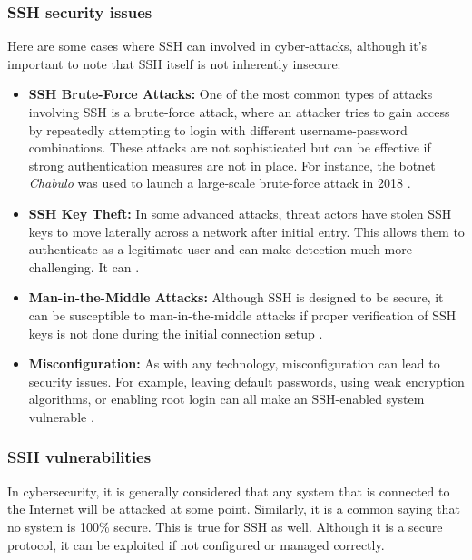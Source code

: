     \subsubsection{SSH security issues}
    Here are some cases where SSH can involved in cyber-attacks, although it's important to note that SSH itself is not inherently insecure:
    \begin{itemize}
        \item \textbf{SSH Brute-Force Attacks:} One of the most common types of attacks involving SSH is a brute-force attack, where an attacker tries to gain access by repeatedly attempting to login with different username-password combinations. These attacks are not sophisticated but can be effective if strong authentication measures are not in place. For instance, the botnet \textit{Chabulo} was used to launch a large-scale brute-force attack  in 2018 \cite{SSHReport18}. 
        \item \textbf{SSH Key Theft:} In some advanced attacks, threat actors have stolen SSH keys to move laterally across a network after initial entry. This allows them to authenticate as a legitimate user and can make detection much more challenging. It can  \cite{SSHIdentityTheft05}.
        \item \textbf{Man-in-the-Middle Attacks:} Although SSH is designed to be secure, it can be susceptible to man-in-the-middle attacks if proper verification of SSH keys is not done during the initial connection setup \cite{OpenSSHUnderHood07}.
        \item \textbf{Misconfiguration:} As with any technology, misconfiguration can lead to security issues. For example, leaving default passwords, using weak encryption algorithms, or enabling root login can all make an SSH-enabled system vulnerable \cite{SSHBotnetInfect21}.
    \end{itemize}

    \subsubsection{SSH vulnerabilities}
    In cybersecurity, it is generally considered that any system that is connected to the Internet will be attacked at some point. Similarly, it is a common saying that no system is 100\% secure. This is true for SSH as well. Although it is a secure protocol, it can be exploited if not configured or managed correctly. 
    
